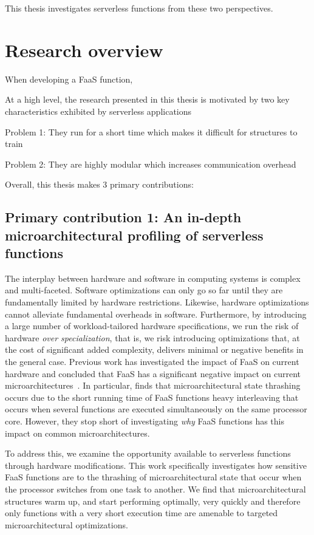 \documentclass[../main.tex]{subfiles}
\begin{document}
\begin{refsection}
This thesis investigates serverless functions from these two perspectives.



\section{Research overview}

When developing a FaaS function, 

At a high level, the research presented in this thesis is motivated by two
key characteristics exhibited by serverless applications

Problem 1: They run for a short time which makes it difficult for structures to train

Problem 2: They are highly modular which increases communication overhead

Overall, this thesis makes 3 primary contributions:


\subsection{Primary contribution 1: An in-depth microarchitectural profiling of serverless functions}
The interplay between hardware and software in computing systems is complex and multi-faceted. Software optimizations can only go so far until they are fundamentally limited by hardware restrictions. Likewise, hardware optimizations cannot alleviate fundamental overheads in software. Furthermore, by introducing a large number of workload-tailored hardware specifications, we run the risk of hardware \emph{over specialization}, that is, we risk introducing optimizations that, at the cost of significant added complexity, delivers minimal or negative benefits in the general case. Previous work has investigated the impact of FaaS on current hardware and concluded that FaaS has a significant negative impact on current microarchitectures~\cite{shahrad19_archit_implic_funct_servic_comput,lukewarm_serverless}. In particular, \textcite{lukewarm_serverless} finds that microarchitectural state thrashing occurs due to the short running time of FaaS functions heavy interleaving that occurs when several functions are executed simultaneously on the same processor core. However, they stop short of investigating \emph{why} FaaS functions has this impact on common microarchitectures.

To address this, we examine the opportunity available to serverless functions through hardware modifications. This work specifically investigates how sensitive FaaS functions are to the thrashing of microarchitectural state that occur when the processor switches from one task to another. We find that microarchitectural structures warm up, and start performing optimally, very quickly and therefore only functions with a very short execution time are amenable to targeted microarchitectural optimizations.



\end{refsection}
\end{document}

